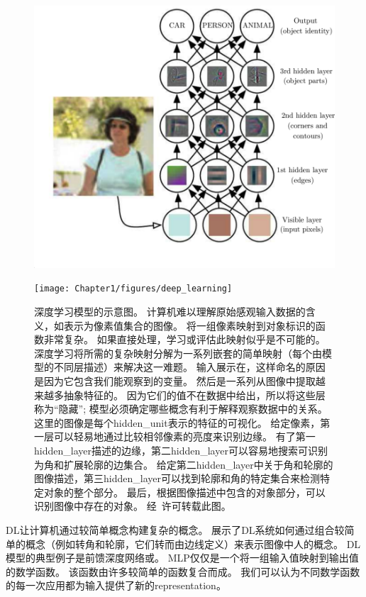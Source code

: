 \begin{figure}[!htb]
\ifOpenSource
\centerline{\includegraphics[scale=0.5]{images/2.png}}
\else
\centerline{\texttt{[image: Chapter1/figures/deep\_learning]}}
\fi
\caption{深度学习模型的示意图。 计算机难以理解原始感观输入数据的含义，如表示为像素值集合的图像。
将一组像素映射到对象标识的函数非常复杂。
如果直接处理，学习或评估此映射似乎是不可能的。
深度学习将所需的复杂映射分解为一系列嵌套的简单映射（每个由模型的不同层描述）来解决这一难题。
输入展示在，这样命名的原因是因为它包含我们能观察到的变量。
然后是一系列从图像中提取越来越多抽象特征的。
因为它们的值不在数据中给出，所以将这些层称为``隐藏''; 模型必须确定哪些概念有利于解释观察数据中的关系。
这里的图像是每个\gls{hidden_unit}表示的特征的可视化。
给定像素，第一层可以轻易地通过比较相邻像素的亮度来识别边缘。
有了第一\gls{hidden_layer}描述的边缘，第二\gls{hidden_layer}可以容易地搜索可识别为角和扩展轮廓的边集合。
给定第二\gls{hidden_layer}中关于角和轮廓的图像描述，第三\gls{hidden_layer}可以找到轮廓和角的特定集合来检测特定对象的整个部分。
最后，根据图像描述中包含的对象部分，可以识别图像中存在的对象。
经~\citet{zeiler2014visualizing}许可转载此图。
}
\label{fig:chap1_deep_learning}
\end{figure}

\gls{DL}让计算机通过较简单概念构建复杂的概念。
展示了\gls{DL}系统如何通过组合较简单的概念（例如转角和轮廓，它们转而由边线定义）来表示图像中人的概念。
\gls{DL}模型的典型例子是前馈深度网络或。
\gls{MLP}仅仅是一个将一组输入值映射到输出值的数学函数。
该函数由许多较简单的函数复合而成。
我们可以认为不同数学函数的每一次应用都为输入提供了新的\gls{representation}。

